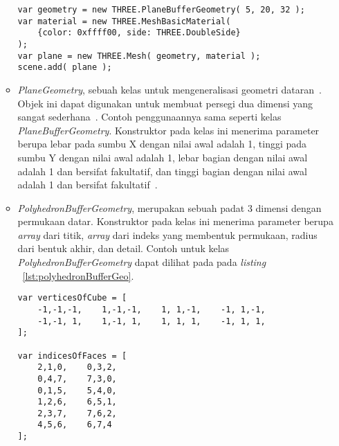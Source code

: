 \begin{itemize}
\begin{itemize}
\begin{lstlisting}[caption={Contoh penggunaan kelas {\it PlaneBufferGeometry}.}, label={lst:planeBufferGeo},captionpos=b]
var geometry = new THREE.PlaneBufferGeometry( 5, 20, 32 );
var material = new THREE.MeshBasicMaterial( 
	{color: 0xffff00, side: THREE.DoubleSide} 
);
var plane = new THREE.Mesh( geometry, material );
scene.add( plane );
\end{lstlisting}
		\item {\it PlaneGeometry}, sebuah kelas untuk mengeneralisasi geometri dataran~\cite{threejs}. Objek ini dapat digunakan untuk membuat persegi dua dimensi yang sangat sederhana~\cite{learningThreejs}. Contoh penggunaannya sama seperti kelas {\it PlaneBufferGeometry}. Konstruktor pada kelas ini menerima parameter berupa lebar pada sumbu X dengan nilai awal adalah 1, tinggi pada sumbu Y dengan nilai awal adalah 1, lebar bagian dengan nilai awal adalah 1 dan bersifat fakultatif, dan tinggi bagian dengan nilai awal adalah 1 dan bersifat fakultatif~\cite{threejs}.
		\item {\it PolyhedronBufferGeometry}, merupakan sebuah padat 3 dimensi dengan permukaan datar. Konstruktor pada kelas ini menerima parameter berupa {\it array} dari titik, {\it array} dari indeks yang membentuk permukaan, radius dari bentuk akhir, dan detail. Contoh untuk kelas {\it PolyhedronBufferGeometry} dapat dilihat pada pada {\it listing} ~\ref{lst:polyhedronBufferGeo}.
	
\begin{lstlisting}[caption={Contoh penggunaan kelas {\it PolyhedronBufferGeometry}.}, label={lst:polyhedronBufferGeo},captionpos=b]
var verticesOfCube = [
    -1,-1,-1,    1,-1,-1,    1, 1,-1,    -1, 1,-1,
    -1,-1, 1,    1,-1, 1,    1, 1, 1,    -1, 1, 1,
];

var indicesOfFaces = [
    2,1,0,    0,3,2,
    0,4,7,    7,3,0,
    0,1,5,    5,4,0,
    1,2,6,    6,5,1,
    2,3,7,    7,6,2,
    4,5,6,    6,7,4
];


\end{lstlisting}
\end{itemize}
\end{itemize}
